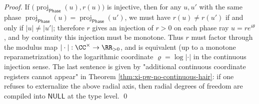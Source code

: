 \begin{proof}
If \(\bigl(\operatorname{proj}_{\mathsf{Phase}}(u),r(u)\bigr)\) is injective, then for any \(u,u'\) with the same phase \(\operatorname{proj}_{\mathsf{Phase}}(u)=\operatorname{proj}_{\mathsf{Phase}}(u')\), we must have \(r(u)\neq r(u')\) if and only if \(|u|\neq |u'|\);
therefore \(r\) gives an injection of \(r>0\) on each phase ray \(u=re^{i\theta}\), and by continuity this injection must be monotone.
Thus \(r\) must factor through the modulus map \(|\cdot|:\CC^\times\to\RR_{>0}\), and is equivalent (up to a monotone reparametrization) to the logarithmic coordinate \(\varrho=\log|\cdot|\) in the continuous injection sense.
The last sentence is given by "additional continuous coordinate registers cannot appear" in Theorem \ref{thm:xi-pw-no-continuous-hair}: if one refuses to externalize the above radial axis, then radial degrees of freedom are compiled into \(\mathsf{NULL}\) at the type level. \qed
\end{proof}


